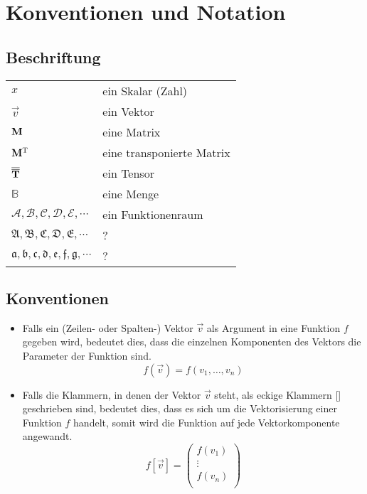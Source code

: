 \documentclass[../main]{subfiles}
\begin{document}
\newcommand{\refsec}[1]{
  \begin{tikzpicture}
    \node[rounded corners,fill=red] (0,0) {#1};
  \end{tikzpicture}
}




\section{Konventionen und Notation}

\subsection*{Beschriftung}

\begin{tabular}{ll}
  $x$ & ein Skalar (Zahl) \\
  $\vec{v}$ & ein Vektor \\
  $\mathbf{M}$ & eine Matrix \\
  $\mathbf{M}^\mathrm{T}$ & eine transponierte Matrix \\
  $\overline{\overline{\mathbf{T}}}$ & ein Tensor \\
  $\mathbb{B}$ & eine Menge \\
  $\mathcal{A,B,C,D,E,\cdots}$ & ein Funktionenraum \\
  $\mathfrak{A,B,C,D,E,\cdots}$ & ? \\
  $\mathfrak{a,b,c,d,e,f,g,\cdots}$ & ? \\


\end{tabular}


\subsection*{Konventionen}

\begin{itemize}

\item{
    Falls ein (Zeilen- oder Spalten-) Vektor $\vec{v}$ als Argument in eine
    Funktion $f$ gegeben wird, bedeutet dies,
    dass die einzelnen Komponenten des Vektors die Parameter der Funktion sind.
    \begin{equation*}
      f(\vec{v})=f(v_1,\ldots,v_n)
    \end{equation*}
  }

\item{
    Falls die Klammern, in denen der Vektor $\vec{v}$ steht, als eckige
    Klammern [] geschrieben sind, bedeutet dies, dass es sich um die
    Vektorisierung einer Funktion $f$ handelt, somit wird die Funktion auf
    jede Vektorkomponente angewandt.
    \begin{equation*}
      f[\vec{v}]=
      \begin{pmatrix}
        f(v_1)\\
        \vdots \\
        f(v_n)\\
      \end{pmatrix}
    \end{equation*}
  }

\end{itemize}
\end{document}
